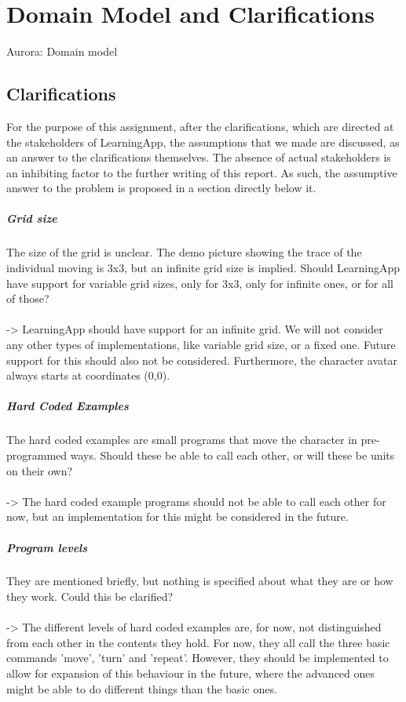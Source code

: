 \chapter{Domain Model and Clarifications}
Aurora: Domain model\\


\section{Clarifications}

For the purpose of this assignment, after the clarifications, which are directed at the stakeholders of LearningApp, the assumptions that we made are discussed, as an answer to the clarifications themselves. The absence of actual stakeholders is an inhibiting factor to the further writing of this report. As such, the assumptive answer to the problem is proposed in a section directly below it. \\

\paragraph{Grid size}
The size of the grid is unclear. The demo picture showing the trace of the individual moving is 3x3, but an infinite grid size is implied. Should LearningApp have support for variable grid sizes, only for 3x3, only for infinite ones, or for all of those?\\~\\
-> LearningApp should have support for an infinite grid. We will not consider any other types of implementations, like variable grid size, or a fixed one. Future support for this should also not be considered. Furthermore, the character avatar always starts at coordinates (0,0). 

\paragraph{Hard Coded Examples}
The hard coded examples are small programs that move the character in pre-programmed ways. Should these be able to call each other, or will these be units on their own?\\~\\
-> The hard coded example programs should not be able to call each other for now, but an implementation for this might be considered in the future. 

\paragraph{Program levels}
They are mentioned briefly, but nothing is specified about what they are or how they work. Could this be clarified?\\~\\
-> The different levels of hard coded examples are, for now, not distinguished from each other in the contents they hold. For now, they all call the three basic commands 'move', 'turn' and 'repeat'. However, they should be implemented to allow for expansion of this behaviour in the future, where the advanced ones might be able to do different things than the basic ones. 


